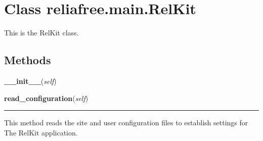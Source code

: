 %
%
%


\section{Class reliafree.main.RelKit}

    \label{reliafree:main:RelKit}
This is the RelKit class.



  \subsection{Methods}

    \label{reliafree:main:RelKit:__init__}

    \vspace{0.5ex}

\hspace{.8\funcindent}\begin{boxedminipage}{\funcwidth}

    \raggedright \textbf{\_\_init\_\_}(\textit{self})

\setlength{\parskip}{2ex}
\setlength{\parskip}{1ex}
    \end{boxedminipage}

    \label{reliafree:main:RelKit:read_configuration}

    \vspace{0.5ex}

\hspace{.8\funcindent}\begin{boxedminipage}{\funcwidth}

    \raggedright \textbf{read\_configuration}(\textit{self})

    \vspace{-1.5ex}

    \rule{\textwidth}{0.5\fboxrule}
\setlength{\parskip}{2ex}
    This method reads the site and user configuration files to establish 
    settings for The RelKit application.

\setlength{\parskip}{1ex}
    \end{boxedminipage}

